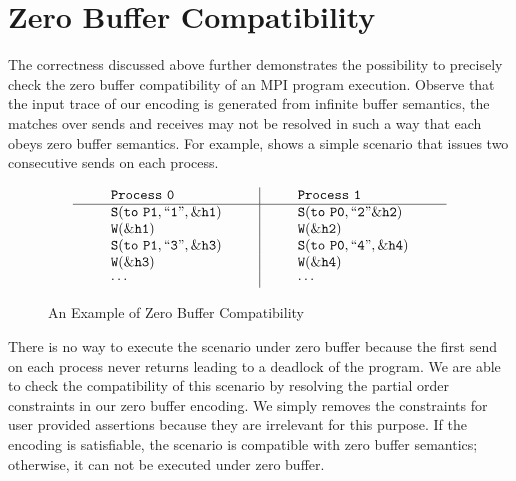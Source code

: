 \section{Zero Buffer Compatibility}
The correctness discussed above further demonstrates the possibility to precisely check the zero buffer compatibility of an MPI program execution. Observe that the input trace of our encoding is generated from infinite buffer semantics, the matches over sends and receives may not be resolved in such a way that each obeys zero buffer semantics. For example,  shows a simple scenario that issues two consecutive sends on each process. 

\begin{figure}[h]
\[
\begin{array}{l|l}
\;\;\;\;\;\;\;\;\mathtt{Process\ 0}\;\;\;\;\;\;\;\; & \;\;\;\;\;\;\;\; \mathtt{Process\ 1}\;\;\;\;\;\;\;\; \\
\hline
\;\;\;\;\;\;\;\;\mathtt{S(to\ P1, ``1",\&h1)}\;\;\;\;\;\;\;\; & \;\;\;\;\;\;\;\; \mathtt{S(to\ P0,``2"\&h2)}\;\;\;\;\;\;\;\; \\
\;\;\;\;\;\;\;\;\mathtt{W(\&h1)}\;\;\;\;\;\;\;\; & \;\;\;\;\;\;\;\; \mathtt{W(\&h2)}\;\;\;\;\;\;\;\; \\
\;\;\;\;\;\;\;\;\mathtt{S(to\ P1,``3",\&h3)}\;\;\;\;\;\;\;\; & \;\;\;\;\;\;\;\; \mathtt{S(to\ P0,``4",\&h4)}\;\;\;\;\;\;\;\; \\
\;\;\;\;\;\;\;\;\mathtt{W(\&h3)}\;\;\;\;\;\;\;\; & \;\;\;\;\;\;\;\; \mathtt{W(\&h4)}\;\;\;\;\;\;\;\; \\
\;\;\;\;\;\;\;\;\mathtt{\cdots}\;\;\;\;\;\;\;\; & \;\;\;\;\;\;\;\; \mathtt{\cdots}\;\;\;\;\;\;\;\; 
\end{array}
\]
\caption{An Example of Zero Buffer Compatibility} \label{fig:compatible}
\end{figure}

There is no way to execute the scenario under zero buffer because the first send on each process never returns leading to a deadlock of the program. We are able to check the compatibility of this scenario by resolving the partial order constraints in our zero buffer encoding. We simply removes the constraints for user provided assertions because they are irrelevant for this purpose. If the encoding is satisfiable, the scenario is compatible with zero buffer semantics; otherwise, it can not be executed under zero buffer. 
